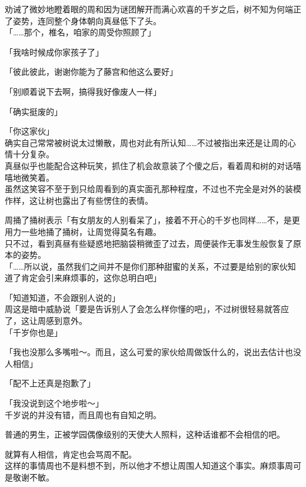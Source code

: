 劝诫了微妙地瞪着眼的周和因为谜团解开而满心欢喜的千岁之后，树不知为何端正了姿势，连同整个身体朝向真昼低下了头。\\

「……那个，椎名，咱家的周受你照顾了」

「我啥时候成你家孩子了」

「彼此彼此，谢谢你能为了藤宫和他这么要好」

「别顺着说下去啊，搞得我好像废人一样」

「确实挺废的」

「你这家伙」\\

确实自己常常被树说太过懒散，周也对此有所认知……不过被指出来还是让周的心情十分复杂。\\

真昼似乎也能配合这种玩笑，抓住了机会故意装了个傻之后，看着周和树的对话嘻嘻地微笑着。\\

虽然这笑容不至于到只给周看到的真实面孔那种程度，不过也不完全是对外的装模作样，这让树也露出了有些愣住的表情。

周捅了捅树表示「有女朋友的人别看呆了」，接着不开心的千岁也同样……不，是更用力一些地捅了捅树，让周觉得莫名有趣。\\

只不过，看到真昼有些疑惑地把脑袋稍微歪了过去，周便装作无事发生般恢复了原本的姿势。\\

「……所以说，虽然我们之间并不是你们那种甜蜜的关系，不过要是给别的家伙知道了肯定会引来麻烦事的，这你总明白吧」

「知道知道，不会跟别人说的」\\

周这是暗中威胁说「要是告诉别人了会怎么样你懂的吧」，不过树很轻易就答应了，这让周感到意外。\\

「千岁你也是」

「我也没那么多嘴啦～。而且，这么可爱的家伙给周做饭什么的，说出去估计也没人相信」

「配不上还真是抱歉了」

「我没说到这个地步啦～」\\

千岁说的并没有错，而且周也有自知之明。

普通的男生，正被学园偶像级别的天使大人照料，这种话谁都不会相信的吧。

就算有人相信，肯定也会骂周不配。\\

这样的事情周也不是料想不到，所以他才不想让周围人知道这个事实。麻烦事周可是敬谢不敏。\\

